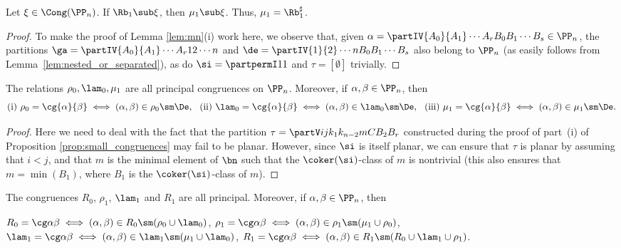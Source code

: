 \begin{lemma}
\label{lem:mn:PPn}
Let $\xi\in\Cong(\PP_n)$.
If $\Rb_1\sub\xi$, then $\mu_1\sub\xi$.  Thus, $\mu_1=\Rb_1^\sharp$.
\end{lemma}

\begin{proof} 
To make the proof of Lemma \ref{lem:mn}(i) work here, we observe that, given
${\alpha=\partIV{A_0}{A_1}\cdots{A_r}{B_0}{B_1}\cdots{B_s}\in\PP_n}$,
the partitions
$\ga=\partIV{A_0}{A_1}\cdots{A_r}{1}{2}\cdots{n}$ and $\de=\partIV{1}{2}\cdots{n}{B_0}{B_1}\cdots{B_s}$ also belong to $\PP_n$ (as easily follows from Lemma~\ref{lem:nested_or_separated}),
as do
$\si=\partpermI11$ and $\tau=[\emptyset]$ trivially.
\end{proof}

\begin{proposition}
\label{prop:small_congruences:PPn}
The relations $\rho_0,\lam_0,\mu_1$ are all principal congruences on $\PP_n$.  Moreover, if $\alpha,\beta\in\PP_n$, then
\[
\textup{(i)}\ 
\rho_0=\cg{\alpha}{\beta}\iff (\alpha,\beta)\in\rho_0\sm\De,\ \ 
\textup{(ii)}\ \lam_0=\cg{\alpha}{\beta}\iff (\alpha,\beta)\in\lam_0\sm\De,\ \ 
\textup{(iii)}\ \mu_1=\cg{\alpha}{\beta}\iff (\alpha,\beta)\in\mu_1\sm\De.
\]
\end{proposition}

\begin{proof} 
Here we need to deal with the fact that the partition $\tau=\partV ij{k_1}{k_{n-2}}{m}{C}{B_2}{B_r}$ constructed during the proof of part~(i) 
of Proposition \ref{prop:small_congruences}
may fail to be planar.  However, since $\si$ is itself planar, we can ensure that $\tau$ is planar by assuming that $i<j$, and that $m$ is the minimal element of $\bn$ such that the $\coker(\si)$-class of $m$ is nontrivial (this also ensures that $m=\min(B_1)$, where $B_1$ is the $\coker(\si)$-class of $m$).  \end{proof}


%
\begin{proposition}
\label{prop:joins2:PPn}
The congruences $R_0$, $\rho_1$, $\lam_1$ and $R_1$ are all principal.  Moreover, if $\alpha,\beta\in\PP_n$, then
\begin{itemize}\begin{multicols}{2}
\itemit{i} $R_0=\cg\alpha\beta\iff (\alpha,\beta)\in R_0 \sm(\rho_0\cup\lam_0)$,
\itemit{ii} $\rho_1=\cg\alpha\beta\iff (\alpha,\beta)\in\rho_1\sm(\mu_1\cup\rho_0)$,
\itemit{iii} $\lam_1=\cg\alpha\beta\iff (\alpha,\beta)\in\lam_1\sm(\mu_1\cup\lam_0)$, 
\itemit{iv} $R_1=\cg\alpha\beta\iff (\alpha,\beta)\in R_1\sm ( R_0 \cup \lam_1 \cup \rho_1 )$.
\end{multicols}
\end{itemize}
\end{proposition}

